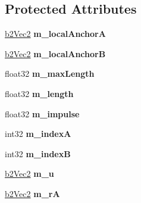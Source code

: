 \subsection*{Protected Attributes}
\begin{DoxyCompactItemize}
\item 
\hyperlink{structb2_vec2}{b2\+Vec2} {\bfseries m\+\_\+local\+AnchorA}\hypertarget{classb2_rope_joint_a43640240dc39c912ea1cc6e1ae9fa614}{}\label{classb2_rope_joint_a43640240dc39c912ea1cc6e1ae9fa614}

\item 
\hyperlink{structb2_vec2}{b2\+Vec2} {\bfseries m\+\_\+local\+AnchorB}\hypertarget{classb2_rope_joint_a57dfab74bae88c2c3284ed640825c959}{}\label{classb2_rope_joint_a57dfab74bae88c2c3284ed640825c959}

\item 
float32 {\bfseries m\+\_\+max\+Length}\hypertarget{classb2_rope_joint_ace7528ca1183f34cfc79e47f46b29130}{}\label{classb2_rope_joint_ace7528ca1183f34cfc79e47f46b29130}

\item 
float32 {\bfseries m\+\_\+length}\hypertarget{classb2_rope_joint_a2cee8c35d881b0ae66d28d13c6d8d66a}{}\label{classb2_rope_joint_a2cee8c35d881b0ae66d28d13c6d8d66a}

\item 
float32 {\bfseries m\+\_\+impulse}\hypertarget{classb2_rope_joint_ac19ae74b5f3c104bc763e99b3986afd6}{}\label{classb2_rope_joint_ac19ae74b5f3c104bc763e99b3986afd6}

\item 
int32 {\bfseries m\+\_\+indexA}\hypertarget{classb2_rope_joint_a34875f5852d011dab695613a23adca08}{}\label{classb2_rope_joint_a34875f5852d011dab695613a23adca08}

\item 
int32 {\bfseries m\+\_\+indexB}\hypertarget{classb2_rope_joint_aa67100c069a1a273314dfa55c9063fc7}{}\label{classb2_rope_joint_aa67100c069a1a273314dfa55c9063fc7}

\item 
\hyperlink{structb2_vec2}{b2\+Vec2} {\bfseries m\+\_\+u}\hypertarget{classb2_rope_joint_ae95185c5ad4c119a9893294491ba1609}{}\label{classb2_rope_joint_ae95185c5ad4c119a9893294491ba1609}

\item 
\hyperlink{structb2_vec2}{b2\+Vec2} {\bfseries m\+\_\+rA}\hypertarget{classb2_rope_joint_af8ae48af2656b1e605a099b8f4aa82b0}{}\label{classb2_rope_joint_af8ae48af2656b1e605a099b8f4aa82b0}


\end{DoxyCompactItemize}
